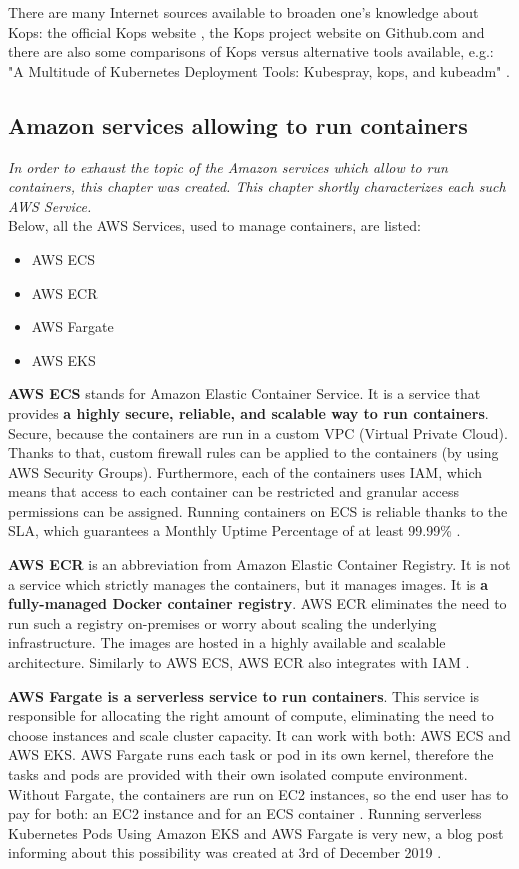 There are many Internet sources available to broaden one's knowledge about Kops: the official Kops website \cite{online-kops}, the Kops project website on Github.com \cite{online-kops-gh} and there are also some comparisons of Kops versus alternative tools available, e.g.: "A Multitude of Kubernetes Deployment Tools: Kubespray, kops, and kubeadm" \cite{online-kops-blog}.

\subsection{Amazon services allowing to run containers}
\textit{In order to exhaust the topic of the Amazon services which allow to run containers, this chapter was created. This chapter shortly characterizes each such AWS Service.}
\\

Below, all the AWS Services, used to manage containers, are listed:
\begin{itemize}
\item AWS ECS
\item AWS ECR
\item AWS Fargate
\item AWS EKS
\end{itemize}

\textbf{AWS ECS} stands for Amazon Elastic Container Service. It is a service that provides \textbf{a highly secure, reliable, and scalable way to run containers}. Secure, because the containers are run in a custom VPC (Virtual Private Cloud). Thanks to that, custom firewall rules can be applied to the containers (by using AWS Security Groups). Furthermore, each of the containers uses IAM, which means that access to each container can be restricted and granular access permissions can be assigned. Running containers on ECS is reliable thanks to the SLA, which guarantees a Monthly Uptime Percentage of at least 99.99\% \cite{ecs}.

\textbf{AWS ECR} is an abbreviation from Amazon Elastic Container Registry. It is not a service which strictly manages the containers, but it manages images. It is \textbf{a fully-managed Docker container registry}. AWS ECR eliminates the need to run such a registry on-premises or worry about scaling the underlying infrastructure. The images are hosted in a highly available and scalable architecture. Similarly to AWS ECS, AWS ECR also integrates with IAM \cite{ecr}.

\textbf{AWS Fargate is a serverless service to run containers}. This service is responsible for allocating the right amount of compute, eliminating the need to choose instances and scale cluster capacity. It can work with both: AWS ECS and AWS EKS. AWS Fargate runs each task or pod in its own kernel, therefore the tasks and pods are provided with their own isolated compute environment. Without Fargate, the containers are run on EC2 instances, so the end user has to pay for both: an EC2 instance and for an ECS container \cite{fargate}. Running serverless Kubernetes Pods Using Amazon EKS and AWS Fargate is very new, a blog post informing about this possibility was created at 3rd of December 2019 \cite{fargate-for-eks}.

